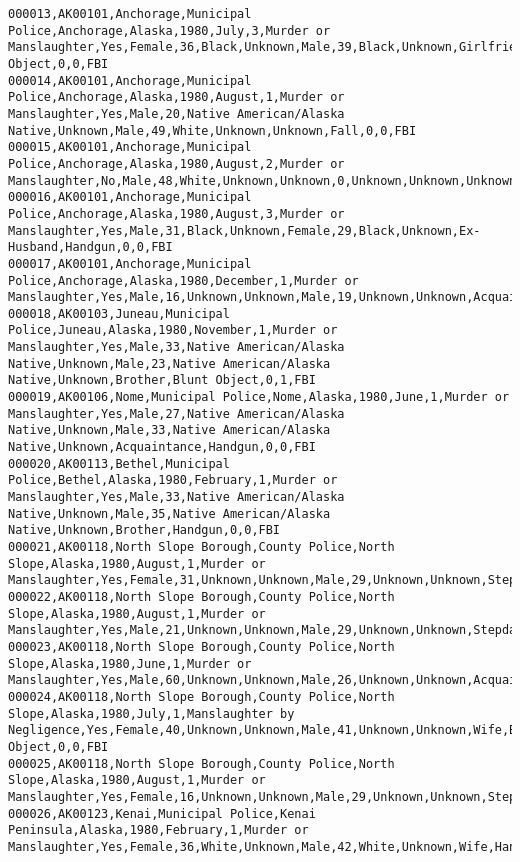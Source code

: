 \begin{lstlisting}
000013,AK00101,Anchorage,Municipal Police,Anchorage,Alaska,1980,July,3,Murder or Manslaughter,Yes,Female,36,Black,Unknown,Male,39,Black,Unknown,Girlfriend,Blunt Object,0,0,FBI
000014,AK00101,Anchorage,Municipal Police,Anchorage,Alaska,1980,August,1,Murder or Manslaughter,Yes,Male,20,Native American/Alaska Native,Unknown,Male,49,White,Unknown,Unknown,Fall,0,0,FBI
000015,AK00101,Anchorage,Municipal Police,Anchorage,Alaska,1980,August,2,Murder or Manslaughter,No,Male,48,White,Unknown,Unknown,0,Unknown,Unknown,Unknown,Handgun,0,0,FBI
000016,AK00101,Anchorage,Municipal Police,Anchorage,Alaska,1980,August,3,Murder or Manslaughter,Yes,Male,31,Black,Unknown,Female,29,Black,Unknown,Ex-Husband,Handgun,0,0,FBI
000017,AK00101,Anchorage,Municipal Police,Anchorage,Alaska,1980,December,1,Murder or Manslaughter,Yes,Male,16,Unknown,Unknown,Male,19,Unknown,Unknown,Acquaintance,Knife,0,0,FBI
000018,AK00103,Juneau,Municipal Police,Juneau,Alaska,1980,November,1,Murder or Manslaughter,Yes,Male,33,Native American/Alaska Native,Unknown,Male,23,Native American/Alaska Native,Unknown,Brother,Blunt Object,0,1,FBI
000019,AK00106,Nome,Municipal Police,Nome,Alaska,1980,June,1,Murder or Manslaughter,Yes,Male,27,Native American/Alaska Native,Unknown,Male,33,Native American/Alaska Native,Unknown,Acquaintance,Handgun,0,0,FBI
000020,AK00113,Bethel,Municipal Police,Bethel,Alaska,1980,February,1,Murder or Manslaughter,Yes,Male,33,Native American/Alaska Native,Unknown,Male,35,Native American/Alaska Native,Unknown,Brother,Handgun,0,0,FBI
000021,AK00118,North Slope Borough,County Police,North Slope,Alaska,1980,August,1,Murder or Manslaughter,Yes,Female,31,Unknown,Unknown,Male,29,Unknown,Unknown,Stepdaughter,Rifle,2,0,FBI
000022,AK00118,North Slope Borough,County Police,North Slope,Alaska,1980,August,1,Murder or Manslaughter,Yes,Male,21,Unknown,Unknown,Male,29,Unknown,Unknown,Stepdaughter,Rifle,2,0,FBI
000023,AK00118,North Slope Borough,County Police,North Slope,Alaska,1980,June,1,Murder or Manslaughter,Yes,Male,60,Unknown,Unknown,Male,26,Unknown,Unknown,Acquaintance,Knife,0,0,FBI
000024,AK00118,North Slope Borough,County Police,North Slope,Alaska,1980,July,1,Manslaughter by Negligence,Yes,Female,40,Unknown,Unknown,Male,41,Unknown,Unknown,Wife,Blunt Object,0,0,FBI
000025,AK00118,North Slope Borough,County Police,North Slope,Alaska,1980,August,1,Murder or Manslaughter,Yes,Female,16,Unknown,Unknown,Male,29,Unknown,Unknown,Stepdaughter,Rifle,2,0,FBI
000026,AK00123,Kenai,Municipal Police,Kenai Peninsula,Alaska,1980,February,1,Murder or Manslaughter,Yes,Female,36,White,Unknown,Male,42,White,Unknown,Wife,Handgun,0,0,FBI

\end{lstlisting}
